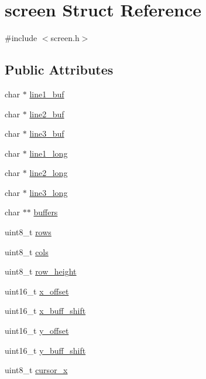 \hypertarget{structscreen}{}\section{screen Struct Reference}
\label{structscreen}


{\ttfamily \#include $<$screen.\+h$>$}

\subsection*{Public Attributes}
\begin{DoxyCompactItemize}
\item 
char $\ast$ \hyperlink{structscreen_a338a29e58e2018c59b64e6acd2e89449}{line1\+\_\+buf}
\item 
char $\ast$ \hyperlink{structscreen_abeaf8700f2107c2c0c50d7d351823696}{line2\+\_\+buf}
\item 
char $\ast$ \hyperlink{structscreen_a1a8903689c83792331e0fa81729960ec}{line3\+\_\+buf}
\item 
char $\ast$ \hyperlink{structscreen_a3d56823f1eaa482f09883a998cccbdb8}{line1\+\_\+long}
\item 
char $\ast$ \hyperlink{structscreen_a9084477be09706e8c3324b348c7f5de6}{line2\+\_\+long}
\item 
char $\ast$ \hyperlink{structscreen_a0f4b1c229f1c74854626309c773268c9}{line3\+\_\+long}
\item 
char $\ast$$\ast$ \hyperlink{structscreen_ac02a9bca6a4f2106231205bfc572f151}{buffers}
\item 
uint8\+\_\+t \hyperlink{structscreen_a90634ac7368a38ac485eaf9cf83200d1}{rows}
\item 
uint8\+\_\+t \hyperlink{structscreen_af7ef9a84e6d1c47dfb367744e5aa5987}{cols}
\item 
uint8\+\_\+t \hyperlink{structscreen_a3c60a06d24993391f6aba53d39cf7658}{row\+\_\+height}
\item 
uint16\+\_\+t \hyperlink{structscreen_a081157d1078058d38d2acdbeb48673a7}{x\+\_\+offset}
\item 
uint16\+\_\+t \hyperlink{structscreen_adf0865f0795425400e41c1a85c308882}{x\+\_\+buff\+\_\+shift}
\item 
uint16\+\_\+t \hyperlink{structscreen_af267e885854662d4da48e2477de499a3}{y\+\_\+offset}
\item 
uint16\+\_\+t \hyperlink{structscreen_a834452f927fb3ac5cd361ec2d1f73ca9}{y\+\_\+buff\+\_\+shift}
\item 
uint8\+\_\+t \hyperlink{structscreen_ab4c52689141fc0e12ae41e0ca813a9f7}{cursor\+\_\+x}
$$
\end{DoxyCompactItemize}
